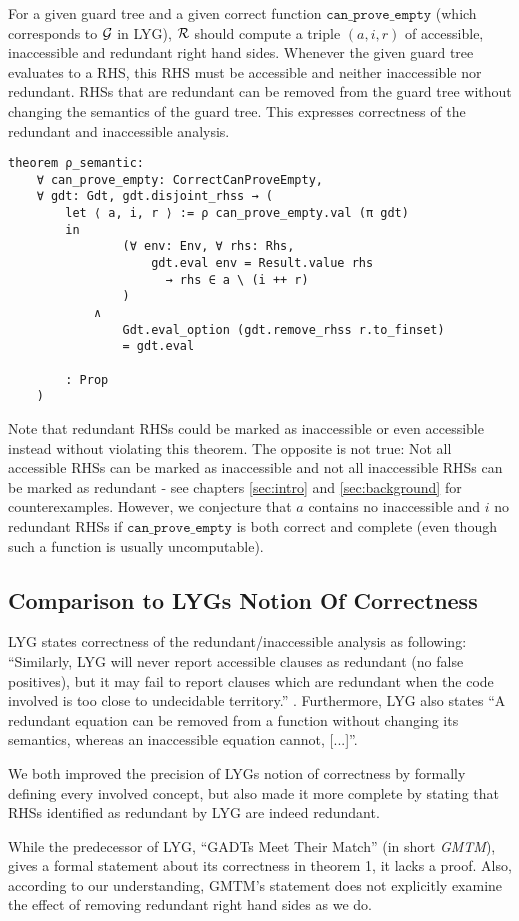 For a given guard tree and a given correct function $\mathtt{can\_prove\_empty}$ (which corresponds to $\mathcal{G}$ in LYG), $\mathcal{R}$
should compute a triple $(a, i, r)$ of accessible, inaccessible and redundant right hand sides.
Whenever the given guard tree evaluates to a RHS, this RHS must be accessible and neither inaccessible nor redundant.
RHSs that are redundant can be removed from the guard tree without changing the semantics of the guard tree.
This expresses correctness of the redundant and inaccessible analysis.

\begin{verbatim}
theorem ρ_semantic:
    ∀ can_prove_empty: CorrectCanProveEmpty,
    ∀ gdt: Gdt, gdt.disjoint_rhss → (
        let ⟨ a, i, r ⟩ := ρ can_prove_empty.val (π gdt)
        in
                (∀ env: Env, ∀ rhs: Rhs,
                    gdt.eval env = Result.value rhs
                      → rhs ∈ a \ (i ++ r)
                )
            ∧
                Gdt.eval_option (gdt.remove_rhss r.to_finset)
                = gdt.eval

        : Prop
    )
\end{verbatim}

Note that redundant RHSs could be marked as inaccessible or even accessible instead without violating this theorem.
The opposite is not true: Not all accessible RHSs can be marked as inaccessible and not all inaccessible RHSs can be marked as redundant - see chapters \ref{sec:intro} and \ref{sec:background} for counterexamples. However, we conjecture that $a$ contains no inaccessible and $i$ no redundant RHSs if $\mathtt{can\_prove\_empty}$ is both correct and complete (even though such a function is usually uncomputable).

\subsection{Comparison to LYGs Notion Of Correctness}

LYG states correctness of the redundant/inaccessible analysis as following:
``Similarly, LYG will never report accessible clauses as
redundant (no false positives), but it may fail to report clauses which are redundant when the code
involved is too close to undecidable territory.'' \cite{10.1145/3408989}.
Furthermore, LYG also states
``A redundant equation can be removed from a
function without changing its semantics, whereas an inaccessible equation cannot, [...]''.

We both improved the precision of LYGs notion of correctness by formally defining every involved concept,
but also made it more complete by stating that RHSs identified as redundant by LYG are indeed redundant.

While the predecessor of LYG, ``GADTs Meet Their Match'' \cite{10.1145/2858949.2784748} (in short \textit{GMTM}),
gives a formal statement about its correctness in theorem 1, it lacks a proof.
Also, according to our understanding,
GMTM's statement does not explicitly examine the effect of removing redundant right hand sides as we do.